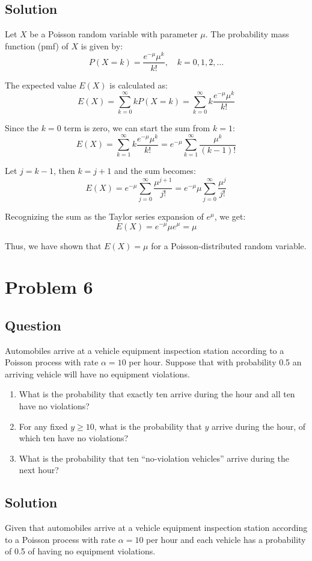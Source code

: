 \documentclass{article}
\begin{document}
\subsection*{Solution}
Let \( X \) be a Poisson random variable with parameter \( \mu \). The probability mass function (pmf) of \( X \) is given by:
\[
P(X = k) = \frac{e^{-\mu} \mu^k}{k!}, \quad k = 0, 1, 2, \ldots
\]

The expected value \( E(X) \) is calculated as:
\[
E(X) = \sum_{k=0}^{\infty} k P(X = k) = \sum_{k=0}^{\infty} k \frac{e^{-\mu} \mu^k}{k!}
\]

Since the \( k = 0 \) term is zero, we can start the sum from \( k = 1 \):
\[
E(X) = \sum_{k=1}^{\infty} k \frac{e^{-\mu} \mu^k}{k!} = e^{-\mu} \sum_{k=1}^{\infty} \frac{\mu^k}{(k-1)!}
\]

Let \( j = k - 1 \), then \( k = j + 1 \) and the sum becomes:
\[
E(X) = e^{-\mu} \sum_{j=0}^{\infty} \frac{\mu^{j+1}}{j!} = e^{-\mu} \mu \sum_{j=0}^{\infty} \frac{\mu^j}{j!}
\]

Recognizing the sum as the Taylor series expansion of \( e^{\mu} \), we get:
\[
E(X) = e^{-\mu} \mu e^{\mu} = \mu
\]

Thus, we have shown that \( E(X) = \mu \) for a Poisson-distributed random variable.
\section*{Problem 6}
\subsection*{Question}
Automobiles arrive at a vehicle equipment inspection station according to a Poisson process with rate \(\alpha = 10\) per hour. Suppose that with probability 0.5 an arriving vehicle will have no equipment violations.

\begin{enumerate}
    \item What is the probability that exactly ten arrive during the hour and all ten have no violations?
    \item For any fixed \(y \geq 10\), what is the probability that \(y\) arrive during the hour, of which ten have no violations?
    \item What is the probability that ten “no-violation vehicles” arrive during the next hour?
\end{enumerate}
\subsection*{Solution}
Given that automobiles arrive at a vehicle equipment inspection station according to a Poisson process with rate \(\alpha = 10\) per hour and each vehicle has a probability of 0.5 of having no equipment violations.
\end{document}
